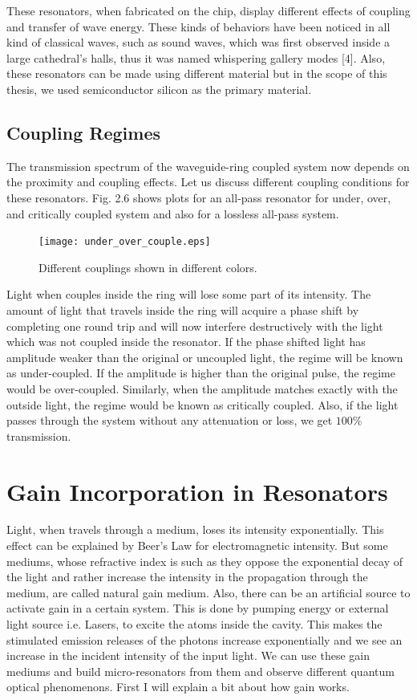 These resonators, when fabricated on the chip, display different effects of coupling and transfer of wave energy. These kinds of behaviors have been noticed in all kind of classical waves, such as sound waves, which was first observed inside a large cathedral's halls, thus it was named whispering gallery modes [4]. Also, these resonators can be made using different material but in the scope of this thesis, we used semiconductor silicon as the primary material. 


\subsection{Coupling Regimes}

The transmission spectrum of the waveguide-ring coupled system now depends on the proximity and coupling effects. Let us discuss different coupling conditions for these resonators. Fig. 2.6 shows plots for an all-pass resonator for under, over, and critically coupled system and also for a lossless all-pass system.

\begin{figure}[h]
\centering
\texttt{[image: under\_over\_couple.eps]}
\caption{Different couplings shown in different colors.}
\end{figure}

Light when couples inside the ring will lose some part of its intensity. The amount of light that travels inside the ring will acquire a phase shift by completing one round trip and will now interfere destructively with the light which was not coupled inside the resonator. If the phase shifted light has amplitude weaker than the original or uncoupled light, the regime will be known as under-coupled. If the amplitude is higher than the original pulse, the regime would be over-coupled. Similarly, when the amplitude matches exactly with the outside light, the regime would be known as critically coupled. Also, if the light passes through the system without any attenuation or loss, we get $100\%$ transmission.


\section{Gain Incorporation in Resonators}
Light, when travels through a medium, loses its intensity exponentially. This effect can be explained by Beer's Law for electromagnetic intensity. But some mediums, whose refractive index is such as they oppose the exponential decay of the light and rather increase the intensity in the propagation through the medium, are called natural gain medium. Also, there can be an artificial source to activate gain in a certain system. This is done by pumping energy or external light source i.e. Lasers, to excite the atoms inside the cavity. This makes the stimulated emission releases of the photons increase exponentially and we see an increase in the incident intensity of the input light. We can use these gain mediums and build micro-resonators from them and observe different quantum optical phenomenons. First I will explain a bit about how gain works.


